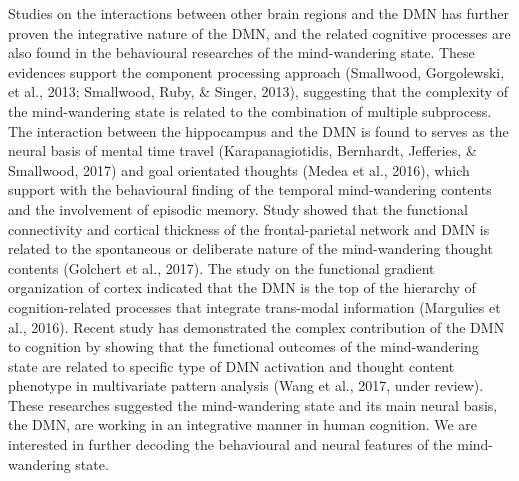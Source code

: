 Studies on the interactions between other brain regions and the DMN has further proven the integrative nature of the DMN, and the related cognitive processes are also found in the behavioural researches of the mind-wandering state. These evidences support the component processing approach (Smallwood, Gorgolewski, et al., 2013; Smallwood, Ruby, \& Singer, 2013), suggesting that the complexity of the mind-wandering state is related to the combination of multiple subprocess. The interaction between the hippocampus and the DMN is found to serves as the neural basis of mental time travel (Karapanagiotidis, Bernhardt, Jefferies, \& Smallwood, 2017) and goal orientated thoughts (Medea et al., 2016), which support with the behavioural finding of the temporal mind-wandering contents and the involvement of episodic memory.  Study showed that the functional connectivity and cortical thickness of the frontal-parietal network and DMN is related to the spontaneous or deliberate nature of the mind-wandering thought contents (Golchert et al., 2017). The study on the functional gradient organization of cortex indicated that the DMN is the top of the hierarchy of cognition-related processes that integrate trans-modal information (Margulies et al., 2016). Recent study has demonstrated the complex contribution of the DMN to cognition by showing that the functional outcomes of the mind-wandering state are related to specific type of DMN activation and thought content phenotype in multivariate pattern analysis (Wang et al., 2017, under review).  These researches suggested the mind-wandering state and its main neural basis, the DMN, are working in an integrative manner in human cognition. We are interested in further decoding the behavioural and neural features of the mind-wandering state. 

